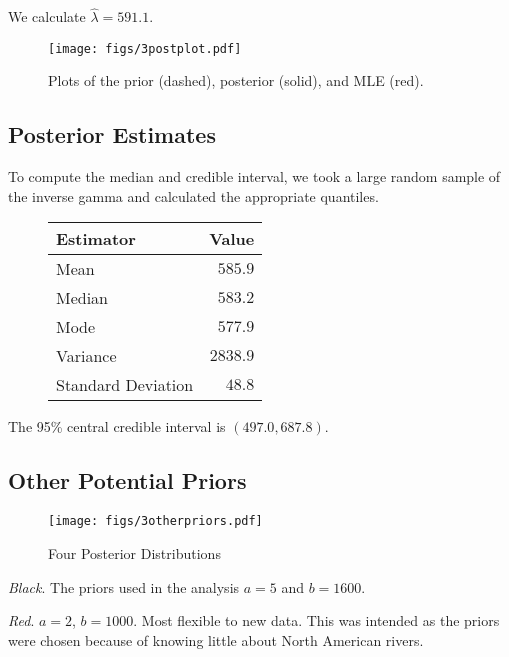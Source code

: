 \documentclass[12pt]{article}
\begin{document}
\noindent We calculate $\hat{\lambda}=591.1$.

\begin{figure}[H]
\begin{center}
\texttt{[image: figs/3postplot.pdf]}
\caption{Plots of the prior (dashed), posterior (solid), and MLE (red).}
\end{center}
\end{figure}

\subsection{Posterior Estimates}

\noindent To compute the median and credible interval, we took a large random sample of the inverse gamma and calculated the appropriate quantiles.

\begin{figure}[H]
\begin{center}
\begin{tabular}{l|r}
Estimator & \multicolumn{1}{l}{Value} \\ \hline \hline
Mean               & $585.9$ \\
Median             & $583.2$ \\
Mode               & $577.9$ \\
Variance           & $2838.9$ \\
Standard Deviation & $48.8$ \\
\end{tabular}
\end{center}
\end{figure}

\noindent The 95\% central credible interval is $(497.0, 687.8)$.

\subsection{Other Potential Priors}

\begin{figure}[H]
\begin{center}
\texttt{[image: figs/3otherpriors.pdf]}
\caption{Four Posterior Distributions}
\end{center}
\end{figure}

\noindent \textit{Black}.  The priors used in the analysis $a=5$ and $b=1600$.

\noindent \textit{Red}. $a=2$, $b=1000$.  Most flexible to new data.  This was intended as the priors were chosen because of knowing little about North American rivers.
\end{document}
